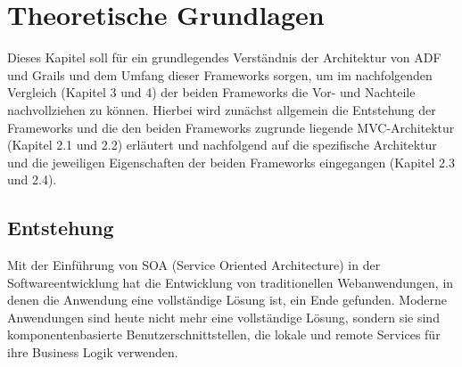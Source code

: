 \section{Theoretische Grundlagen}
Dieses Kapitel soll für ein grundlegendes Verständnis der Architektur von ADF und Grails und dem Umfang dieser Frameworks sorgen, um im nachfolgenden Vergleich (Kapitel 3 und 4) der beiden Frameworks die Vor- und Nachteile nachvollziehen zu können. Hierbei wird zunächst allgemein die Entstehung der Frameworks und die den beiden Frameworks zugrunde liegende MVC-Architektur (Kapitel 2.1 und 2.2) erläutert und nachfolgend auf die spezifische Architektur und die jeweiligen Eigenschaften der beiden Frameworks eingegangen (Kapitel 2.3 und 2.4).

\subsection{Entstehung}
Mit der Einführung von SOA (Service Oriented Architecture) in der Softwareentwicklung hat die Entwicklung von traditionellen Webanwendungen, in denen die Anwendung eine vollständige Lösung ist, ein Ende gefunden. Moderne Anwendungen sind heute nicht mehr eine vollständige Lösung, sondern sie sind komponentenbasierte Benutzerschnittstellen, die lokale und remote Services für ihre Business Logik verwenden. \autocite[S. XXI]{OFDG2010}
